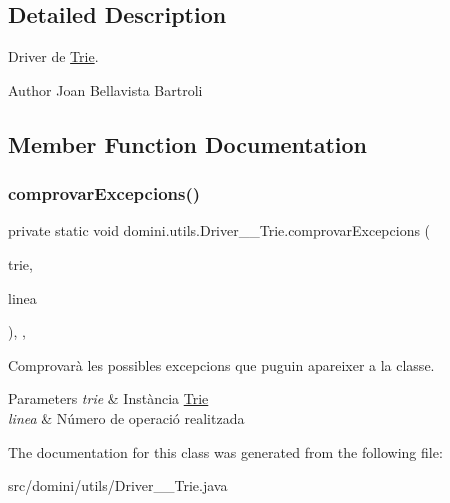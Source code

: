\subsection{Detailed Description}
Driver de \hyperlink{classdomini_1_1utils_1_1Trie}{Trie}. 

\begin{DoxyAuthor}{Author}
Joan Bellavista Bartroli 
\end{DoxyAuthor}


\subsection{Member Function Documentation}
\mbox{\label{classdomini_1_1utils_1_1Driver____Trie_a6fd273250b3951144ce3a76f26330ab1}} 
\subsubsection{\texorpdfstring{comprovar\+Excepcions()}{comprovarExcepcions()}}
{\footnotesize\ttfamily private static void domini.\+utils.\+Driver\+\_\+\+\_\+\+Trie.\+comprovar\+Excepcions (\begin{DoxyParamCaption}\item[{\hyperlink{classdomini_1_1utils_1_1Trie}{Trie}$<$ Byte $>$}]{trie,  }\item[{String}]{linea }\end{DoxyParamCaption})\hspace{0.3cm}{\ttfamily [inline]}, {\ttfamily [static]}, {\ttfamily [private]}}



Comprovarà les possibles excepcions que puguin apareixer a la classe. 


\begin{DoxyParams}{Parameters}
{\em trie} & Instància \hyperlink{classdomini_1_1utils_1_1Trie}{Trie} \\
\hline
{\em linea} & Número de operació realitzada \\
\hline
\end{DoxyParams}


The documentation for this class was generated from the following file\+:\begin{DoxyCompactItemize}
\item 
src/domini/utils/Driver\+\_\+\+\_\+\+Trie.\+java\end{DoxyCompactItemize}
